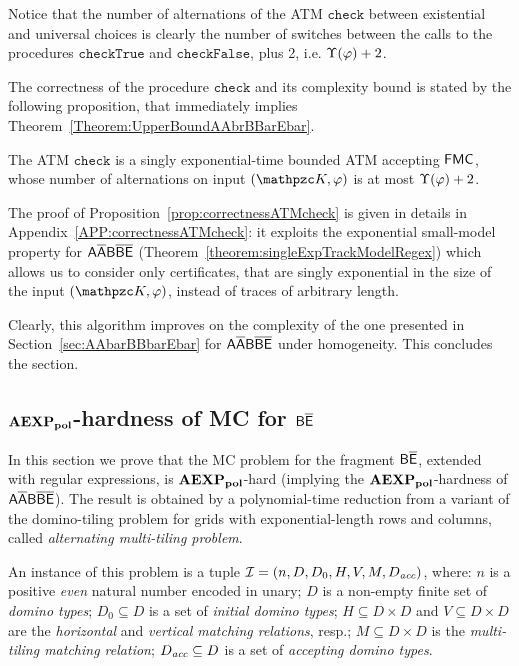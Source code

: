   Notice that the number of alternations of the ATM $\texttt{check}$  between existential  and universal choices is clearly the number of switches between the calls to the procedures $\texttt{checkTrue}$ and $\texttt{checkFalse}$, plus 2, i.e. $\Upsilon(\varphi)+2$.
 

The correctness of the procedure $\texttt{check}$ and its complexity bound is stated by the following proposition, that immediately implies Theorem~\ref{Theorem:UpperBoundAAbrBBarEbar}.   

\begin{proposition}\label{prop:correctnessATMcheck}The ATM $\texttt{check}$ is a singly exponential-time bounded ATM accepting $\mathsf{FMC}$,  whose number of alternations on input $(\Ku,\varphi)$ is at most $\Upsilon(\varphi)+2$.
\end{proposition}

The proof of Proposition~\ref{prop:correctnessATMcheck} is given in details in Appendix~\ref{APP:correctnessATMcheck}: it exploits the exponential small-model property for $\mathsf{A\overline{A}B\overline{B}\overline{E}}$ (Theorem~\ref{theorem:singleExpTrackModelRegex}) which allows us to consider only certificates, that are singly exponential in the size of the input $(\Ku,\varphi)$, instead of traces of arbitrary length. 

Clearly, this algorithm improves on the complexity of the one presented in Section~\ref{sec:AAbarBBbarEbar} for $\mathsf{A\overline{A}B\overline{B}\overline{E}}$ under homogeneity.
This concludes the section.

\subsection{$\mathbf{AEXP_{pol}}$-hardness of MC for $\mathsf{B\overline{E}}$}\label{sec:LowerBound}
In this section we prove that the MC problem for the fragment $\mathsf{B\overline{E}}$, extended with regular expressions, is $\mathbf{AEXP_{pol}}$-hard (implying the $\mathbf{AEXP_{pol}}$-hardness of $\mathsf{A\overline{A}B\overline{B}\overline{E}}$). The result is obtained by a polynomial-time reduction from
a variant of the domino-tiling problem for grids with exponential-length rows and columns, 
 called \emph{alternating multi-tiling problem}.
  
An instance of this problem is a tuple $\mathcal{I}=(n,D,D_0,H,V, M,D_{\textit{acc}})$, where: $n$ is a positive \emph{even} natural number encoded in unary; $D$ is a  non-empty finite set of \emph{domino types}; $D_0\subseteq D$ is a set of \emph{initial domino types}; $H\subseteq D\times D$ and $V\subseteq D\times D$  are the \emph{horizontal} and \emph{vertical matching relations}, resp.;
 $M\subseteq D\times D$ is the \emph{multi-tiling matching relation};
 $D_{\textit{acc}}\subseteq D$ is a set of \emph{accepting domino types}.

